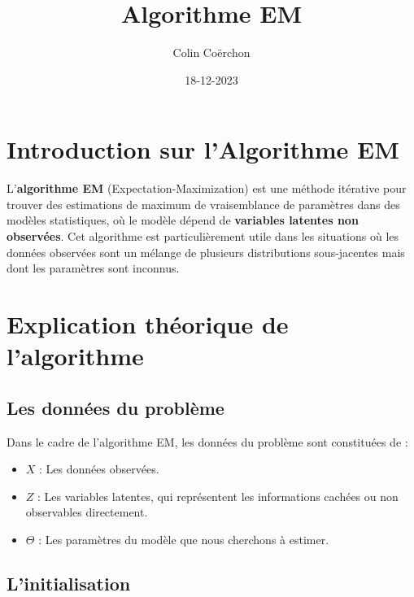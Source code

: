 \documentclass[
]{article}
\title{Algorithme EM}
\author{Colin Coërchon}
\date{18-12-2023}
\begin{document}
\maketitle

{
\setcounter{tocdepth}{2}
\tableofcontents
}


\newpage

\hypertarget{introduction-sur-lalgorithme-em}{%
\section{Introduction sur l'Algorithme
EM}\label{introduction-sur-lalgorithme-em}}

L'\textbf{algorithme EM} (Expectation-Maximization) est une méthode
itérative pour trouver des estimations de maximum de vraisemblance de
paramètres dans des modèles statistiques, où le modèle dépend de
\textbf{variables latentes non observées}. Cet algorithme est
particulièrement utile dans les situations où les données observées sont
un mélange de plusieurs distributions sous-jacentes mais dont les
paramètres sont inconnus.

\hypertarget{explication-thuxe9orique-de-lalgorithme}{%
\section{Explication théorique de
l'algorithme}\label{explication-thuxe9orique-de-lalgorithme}}

\hypertarget{les-donnuxe9es-du-probluxe8me}{%
\subsection{Les données du
problème}\label{les-donnuxe9es-du-probluxe8me}}

Dans le cadre de l'algorithme EM, les données du problème sont
constituées de :

\begin{itemize}
    \item $X$ : Les données observées.
    \item $Z$ : Les variables latentes, qui représentent les informations cachées ou non observables directement.
    \item $\Theta$ : Les paramètres du modèle que nous cherchons à estimer.
\end{itemize}

\hypertarget{linitialisation}{%
\subsection{L'initialisation}\label{linitialisation}}
\end{document}
